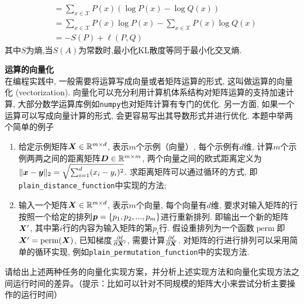 \documentclass[answers]{exam}  %
\begin{document}
\begin{questions}
\begin{solution}
\begin{enumerate}
\begin{align*}
                                   & =\sum_{x\in \mathcal{X}}P(x)(\log P(x)-\log Q(x) )                         \\
                                   & =\sum_{x\in \mathcal{X}}P(x)\log P(x)-\sum_{x\in \mathcal{X}}P(x)\log Q(x) \\
                                   & =-S(P)+\ell (P,Q)
                  \end{align*}
                  其中$S$为熵,当$S(A)$为常数时,最小化KL散度等同于最小化交叉熵.
        \end{enumerate}
    \end{solution}

    \question [20] \textbf{运算的向量化} \\
    在编程实践中, 一般需要将运算写成向量或者矩阵运算的形式, 这叫做运算的向量化 (vectorization).
    向量化可以充分利用计算机体系结构对矩阵运算的支持加速计算,
    大部分数学运算库例如\lstinline{numpy}也对矩阵计算有专门的优化.
    另一方面, 如果一个运算可以写成向量计算的形式, 会更容易写出其导数形式并进行优化.
    本题中举两个简单的例子
    \begin{enumerate}
        \item 给定示例矩阵$\boldsymbol{X} \in \mathbb{R}^{m\times d}$, 表示$m$个示例（向量）, 每个示例有$d$维,
              计算$m$个示例两两之间的距离矩阵$\boldsymbol{D} \in \mathbb{R}^{m\times m}$,
              两个向量之间的欧式距离定义为$\|{\boldsymbol{x}} - \boldsymbol{y}\|_2=\sqrt{\sum_{i=1}^{d} (x_i - y_i)^2}$.
              求距离矩阵可以通过循环的方式, 即\lstinline{plain_distance_function}中实现的方法;
              
        \item 输入一个矩阵$\boldsymbol{X} \in \mathbb{R}^{m\times d}$, 表示$m$个向量, 每个向量有$d$维,
              要求对输入矩阵的行按照一个给定的排列$\boldsymbol{p}=\{p_{1}, p_{2}, ..., p_m\}$进行重新排列.
              即输出一个新的矩阵$\boldsymbol{X}^\prime$, 其中第$i$行的内容为输入矩阵的第$p_{i}$行.
              假设重排列为一个函数$\operatorname{perm}$即$\boldsymbol{X}^\prime = \operatorname{perm}(\boldsymbol{X})$, 已知梯度$\frac{\partial \ell}{\partial \boldsymbol{X}^\prime}$,
              需要计算$\frac{\partial \ell}{\partial \boldsymbol{X}}$. 对矩阵的行进行排列可以采用简单的循环实现, 例如\lstinline{plain_permutation_function}中的实现方法.
              
    \end{enumerate}
    请给出上述两种任务的向量化实现方案，并分析上述实现方法和向量化实现方法之间运行时间的差异。（提示：比如可以针对不同规模的矩阵大小来尝试分析主要操作的运行时间）


\end{questions}
\end{document}
